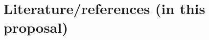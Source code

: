 \documentclass[a4paper,10pt,fleqn]{application}
\begin{document}



\newpage
\section{Literature/references (in this proposal)}



\begingroup
\raggedright

\endgroup

%
%
\end{document}
